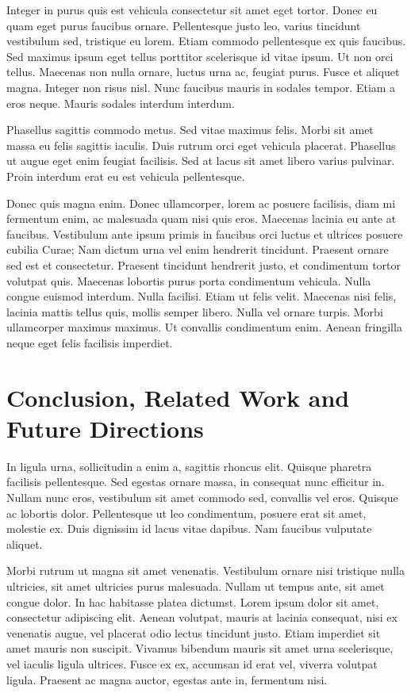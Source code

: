 \documentclass[a4paper,twoside,notitlepage,openright,11pt]{report}
\begin{document}
Integer in purus quis est vehicula consectetur sit amet eget tortor. Donec eu quam eget purus faucibus ornare. Pellentesque justo leo, varius tincidunt vestibulum sed, tristique eu lorem. Etiam commodo pellentesque ex quis faucibus. Sed maximus ipsum eget tellus porttitor scelerisque id vitae ipsum. Ut non orci tellus. Maecenas non nulla ornare, luctus urna ac, feugiat purus. Fusce et aliquet magna. Integer non risus nisl. Nunc faucibus mauris in sodales tempor. Etiam a eros neque. Mauris sodales interdum interdum.

Phasellus sagittis commodo metus. Sed vitae maximus felis. Morbi sit amet massa eu felis sagittis iaculis. Duis rutrum orci eget vehicula placerat. Phasellus ut augue eget enim feugiat facilisis. Sed at lacus sit amet libero varius pulvinar. Proin interdum erat eu est vehicula pellentesque.

Donec quis magna enim. Donec ullamcorper, lorem ac posuere facilisis, diam mi fermentum enim, ac malesuada quam nisi quis eros. Maecenas lacinia eu ante at faucibus. Vestibulum ante ipsum primis in faucibus orci luctus et ultrices posuere cubilia Curae; Nam dictum urna vel enim hendrerit tincidunt. Praesent ornare sed est et consectetur. Praesent tincidunt hendrerit justo, et condimentum tortor volutpat quis. Maecenas lobortis purus porta condimentum vehicula. Nulla congue euismod interdum. Nulla facilisi. Etiam ut felis velit. Maecenas nisi felis, lacinia mattis tellus quis, mollis semper libero. Nulla vel ornare turpis. Morbi ullamcorper maximus maximus. Ut convallis condimentum enim. Aenean fringilla neque eget felis facilisis imperdiet.

\chapter{Conclusion, Related Work and Future Directions}
In ligula urna, sollicitudin a enim a, sagittis rhoncus elit. Quisque pharetra facilisis pellentesque. Sed egestas ornare massa, in consequat nunc efficitur in. Nullam nunc eros, vestibulum sit amet commodo sed, convallis vel eros. Quisque ac lobortis dolor. Pellentesque ut leo condimentum, posuere erat sit amet, molestie ex. Duis dignissim id lacus vitae dapibus. Nam faucibus vulputate aliquet.

Morbi rutrum ut magna sit amet venenatis. Vestibulum ornare nisi tristique nulla ultricies, sit amet ultricies purus malesuada. Nullam ut tempus ante, sit amet congue dolor. In hac habitasse platea dictumst. Lorem ipsum dolor sit amet, consectetur adipiscing elit. Aenean volutpat, mauris at lacinia consequat, nisi ex venenatis augue, vel placerat odio lectus tincidunt justo. Etiam imperdiet sit amet mauris non suscipit. Vivamus bibendum mauris sit amet urna scelerisque, vel iaculis ligula ultrices. Fusce ex ex, accumsan id erat vel, viverra volutpat ligula. Praesent ac magna auctor, egestas ante in, fermentum nisi.
\end{document}

